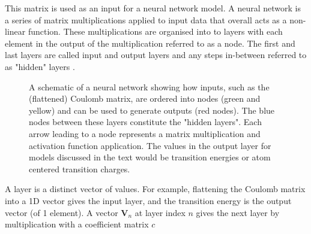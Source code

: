 This matrix is used as an input for a neural network model. A neural network is 
a series of matrix multiplications applied to input data that overall acts as a
non-linear function. These multiplications are organised into to layers with each 
element in the output of the multiplication referred to as a node. The first and
last layers are called  input and output layers and any steps in-between referred
to as "hidden" layers \cite{Rumelhart1986}.

\begin{figure}
	\centering
	\begin{neuralnetwork}[height=4]
        \hiddenlayer[count=4, bias=false, title=Hidden\\layer 1] \linklayers
        \hiddenlayer[count=3, bias=false, title=Hidden\\layer 2] \linklayers
        \outputlayer[count=2, title=Output\\layer] \linklayers
	\end{neuralnetwork}
	\caption{A schematic of a neural network showing how inputs, such as the
	(flattened) Coulomb matrix, are ordered into nodes (green and yellow) and can
	be used to generate outputs (red nodes). The blue nodes between these layers
	constitute the "hidden layers". Each arrow leading to a node represents a matrix
	multiplication and activation function application. The values in the output
	layer for models discussed in the text would be \Qy transition energies or atom
	centered transition charges.}
	\label{fig:neural_network}
\end{figure}

A layer is a distinct vector of values. For example, flattening the Coulomb matrix
into a 1D vector gives the input layer, and the \Qy transition energy is the output 
vector (of 1 element). A vector $\mathbf{V}_n$ at layer index $n$ gives the next layer
by multiplication with a coefficient matrix $c$

